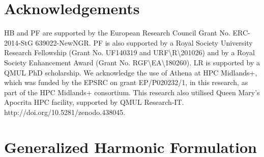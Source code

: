 \documentclass[a4paper,11pt]{article}
\numberwithin{equation}{section}
\begin{document}
\section*{Acknowledgements}
HB and PF are supported by the European Research Council Grant No. ERC-2014-StG 639022-NewNGR. PF is also supported by a Royal Society University Research Fellowship (Grant No. UF140319 and URF\textbackslash R\textbackslash 201026) and by a Royal Society Enhancement Award (Grant No. RGF\textbackslash EA\textbackslash 180260). LR is supported by a QMUL PhD scholarship. We acknowledge the use of Athena at HPC Midlands+, which was funded by the EPSRC on 
grant EP/P020232/1, in this research, as part of the HPC Midlands+ consortium. This research also utilised Queen Mary's Apocrita HPC facility, supported by QMUL Research-IT. http://doi.org/10.5281/zenodo.438045.

\appendix
\setcounter{tocdepth}{1}
\section{Generalized Harmonic Formulation}
\label{sec:GHfor}
\end{document}
